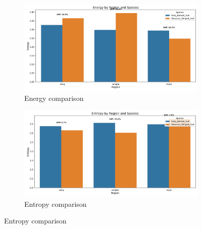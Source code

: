 \documentclass[a4paper,12pt]{report}
\begin{document}
\begin{figure}[H]
    \begin{subfigure}[t]{0.48\textwidth}
        \centering
        \includegraphics[width=\textwidth]{images/appendix/Original/energy_comparison.png}
        \caption{Energy comparison}
    \end{subfigure}
    \hfill
    \begin{subfigure}[t]{0.48\textwidth}
        \centering
        \includegraphics[width=\textwidth]{images/appendix/Original/entropy_comparison.png}
        \caption{Entropy comparison}
    \end{subfigure}
    
    \vspace{0.5cm}
    

\end{figure}
\end{document}
